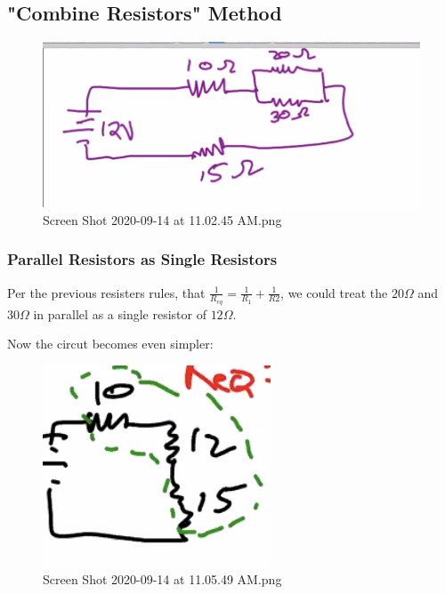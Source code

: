 \documentclass[letterpaper]{article}
\begin{document}
\subsection{"Combine Resistors" Method}
\label{sec:org8f632df}
\begin{figure}[htbp]
\centering
\includegraphics[width=.9\linewidth]{./Screen Shot 2020-09-14 at 11.02.45 AM.png}
\caption{Screen Shot 2020-09-14 at 11.02.45 AM.png}
\end{figure}

\subsubsection{Parallel Resistors as Single Resistors}
\label{sec:org8ffd48a}
Per the previous resisters rules, that
\(\frac{1}{R_{eq}} = \frac{1}{R_1} + \frac{1}{R2}\), we could treat the
\(20 \Omega\) and \(30 \Omega\) in parallel as a single resistor of
\(12 \Omega\).

Now the circut becomes even simpler:

\begin{figure}[htbp]
\centering
\includegraphics[width=.9\linewidth]{./Screen Shot 2020-09-14 at 11.05.49 AM.png}
\caption{Screen Shot 2020-09-14 at 11.05.49 AM.png}
\end{figure}
\end{document}
